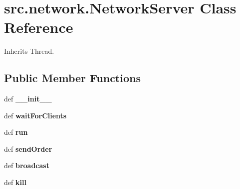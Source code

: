 \hypertarget{classsrc_1_1network_1_1_network_server}{\section{src.\-network.\-Network\-Server \-Class \-Reference}
\label{classsrc_1_1network_1_1_network_server}
}


\-Inherits \-Thread.

\subsection*{\-Public \-Member \-Functions}
\begin{DoxyCompactItemize}
\item 
\hypertarget{classsrc_1_1network_1_1_network_server_a039e381f87c229e9158c452edb57b8a3}{def {\bfseries \-\_\-\-\_\-init\-\_\-\-\_\-}}\label{classsrc_1_1network_1_1_network_server_a039e381f87c229e9158c452edb57b8a3}

\item 
\hypertarget{classsrc_1_1network_1_1_network_server_af334f8d7eed6eca8a8ba7088945634a9}{def {\bfseries wait\-For\-Clients}}\label{classsrc_1_1network_1_1_network_server_af334f8d7eed6eca8a8ba7088945634a9}

\item 
\hypertarget{classsrc_1_1network_1_1_network_server_ad0dba462246e4f49d69ce4b5395389e1}{def {\bfseries run}}\label{classsrc_1_1network_1_1_network_server_ad0dba462246e4f49d69ce4b5395389e1}

\item 
\hypertarget{classsrc_1_1network_1_1_network_server_afdb13f3f3e49a452518553d7c980772f}{def {\bfseries send\-Order}}\label{classsrc_1_1network_1_1_network_server_afdb13f3f3e49a452518553d7c980772f}

\item 
\hypertarget{classsrc_1_1network_1_1_network_server_a03dc0456c8bf224b47531f171dbecf69}{def {\bfseries broadcast}}\label{classsrc_1_1network_1_1_network_server_a03dc0456c8bf224b47531f171dbecf69}

\item 
\hypertarget{classsrc_1_1network_1_1_network_server_a617ffd6ccce5e6c852c50ab39d779588}{def {\bfseries kill}}\label{classsrc_1_1network_1_1_network_server_a617ffd6ccce5e6c852c50ab39d779588}

\end{DoxyCompactItemize}
